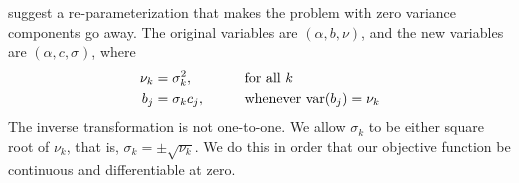 \citet{reaster} suggest a re-parameterization that makes the problem with
zero variance components go away.
The original variables are $(\alpha, b, \nu)$, and
the new variables are $(\alpha, c, \sigma)$, where
\begin{alignat*}{2}
   \nu_k & = \sigma^2_k, & \qquad & \text{for all $k$}
   \\
   b_j & = \sigma_k c_j, & & \text{whenever $\operatorname{var}(b_j) = \nu_k$}
\end{alignat*}
The inverse transformation is not one-to-one.  We allow $\sigma_k$ to be
either square root of $\nu_k$, that is, $\sigma_k = \pm \sqrt{\nu_k}$.
We do this in order that our objective function be continuous and
differentiable at zero.

